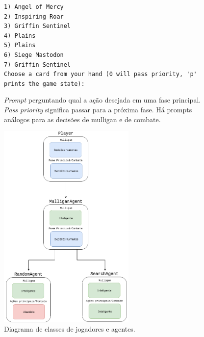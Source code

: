 \begin{figure}[h!]
  \begin{center}
  \begin{Verbatim}
1) Angel of Mercy
2) Inspiring Roar
3) Griffin Sentinel
4) Plains
5) Plains
6) Siege Mastodon
7) Griffin Sentinel
Choose a card from your hand (0 will pass priority, 'p' prints the game state):
  \end{Verbatim}
\end{center}
  \caption{\textit{Prompt} perguntando qual a ação desejada em uma fase principal. \textit{Pass priority} significa passar para a próxima fase. Há prompts análogos para as decisões de mulligan e de combate.}
  \label{mainactionprompt}
\end{figure}

\begin{figure}[!h]
  \centering
  \includegraphics[width=0.6\textwidth]{picstcc/playerdiagram.png}
  \caption{Diagrama de classes de jogadores e agentes.}
  \label{classdiagram}
\end{figure}


